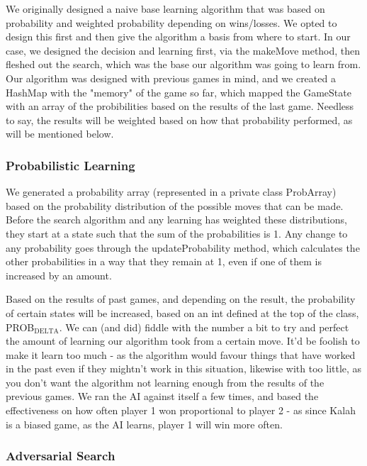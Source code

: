 \documentclass[11pt]{article}
\begin{document}
We originally designed a naive base learning algorithm that was based on probability and weighted probability depending on wins/losses. We opted to design this first and then give the algorithm a basis from where to start. In our case, we designed the decision and learning first, via the makeMove method, then fleshed out the search, which was the base our algorithm was going to learn from. Our algorithm was designed with previous games in mind, and we created a HashMap with the "memory" of the game so far, which mapped the GameState with an array of the probibilities based on the results of the last game. Needless to say, the results will be weighted based on how that probability performed, as will be mentioned below.

\subsubsection{Probabilistic Learning}
\label{sec-3-2-1}

We generated a probability array (represented in a private class ProbArray) based on the probability distribution of the possible moves that can be made. Before the search algorithm and any learning has weighted these distributions, they start at a state such that the sum of the probabilities is 1. Any change to any probability goes through the updateProbability method, which calculates the other probabilities in a way that they remain at 1, even if one of them is increased by an amount.

Based on the results of past games, and depending on the result, the probability of certain states will be increased, based on an int defined at the top of the class, PROB$_{\text{DELTA}}$. We can (and did) fiddle with the number a bit to try and perfect the amount of learning our algorithm took from a certain move. It'd be foolish to make it learn too much - as the algorithm would favour things that have worked in the past even if they mightn't work in this situation, likewise with too little, as you don't want the algorithm not learning enough from the results of the previous games. We ran the AI against itself a few times, and based the effectiveness on how often player 1 won proportional to player 2 - as since Kalah is a biased game, as the AI learns, player 1 will win more often.
\subsubsection{Adversarial Search}
\label{sec-3-2-2}
\end{document}
